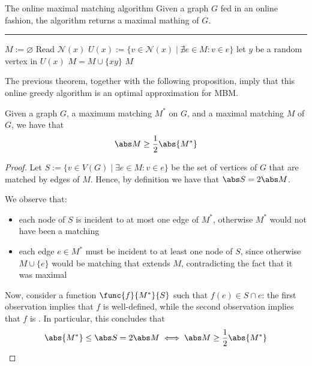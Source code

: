 \documentclass[a4paper, 12pt]{report}
\begin{document}
    \begin{framedalgo}{The online maximal matching algorithm}
        Given a graph $G$ fed in an online fashion, the algorithm returns a maximal mathing of $G$. \\
        \hrule

        \quad
        \begin{algorithmic}[1]
                \State $M := \varnothing$
                    \State Read $\mathcal N(x)$
                    \State $U(x) := \{v \in \mathcal N(x) \mid \nexists e \in M : v \in e\}$
                        \State let $y$ be a random vertex in $U(x)$
                        \STate $M = M \cup \{xy\}$
                    \EndIf
                \EndWhile
                \State {} $M$
            \EndFunction
        \end{algorithmic}
    \end{framedalgo}

    The previous theorem, together with the following proposition, imply that this online greedy algorithm is an optimal approximation for MBM.

    \begin{framedprop}{}
        Given a graph $G$, a maximum matching $M^*$ on $G$, and a maximal matching $M$ of $G$, we have that $$\abs M \ge \dfrac{1}{2} \abs{M^*}$$
    \end{framedprop}

    \begin{proof}
        Let $S := \{v \in V(G) \mid \exists e \in M : v \in e\}$ be the set of vertices of $G$ that are matched by edges of $M$. Hence, by definition we have that $\abs S = 2 \abs M$.

        We observe that:

        \begin{itemize}
            \item each node of $S$ is incident to at most one edge of $M^*$, otherwise $M^*$ would not have been a matching
            \item each edge $e \in M^*$ must be incident to at least one node of $S$, since otherwise $M \cup \{e\}$ would be matching that extends $M$, contradicting the fact that it was maximal
        \end{itemize}

        Now, consider a function $\func{f}{M^*}{S}$ such that $f(e) \in S \cap e$: the first observation implies that $f$ is well-defined, while the second observation implies that $f$ is . In particular, this concludes that $$\abs{M^*} \le \abs S = 2 \abs M \iff \abs M \ge \dfrac{1}{2} \abs{M^*}$$
    \end{proof}
\end{document}

